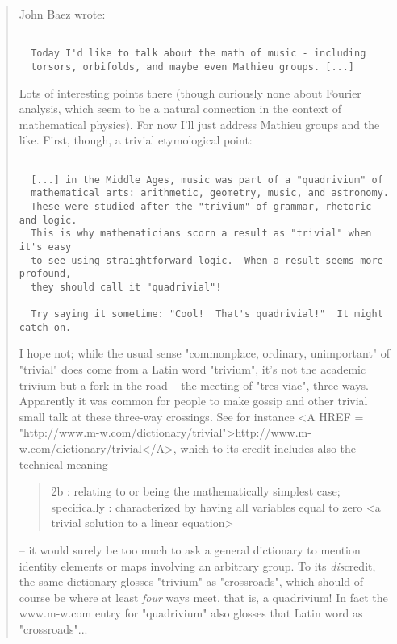 \begin{quote}

John Baez wrote:


\begin{verbatim}

  Today I'd like to talk about the math of music - including
  torsors, orbifolds, and maybe even Mathieu groups. [...]
\end{verbatim}
    

Lots of interesting points there (though curiously none about
Fourier analysis, which seem to be a natural connection in the context
of mathematical physics).  For now I'll just address Mathieu groups
and the like.  First, though, a trivial etymological point:


\begin{verbatim}

  [...] in the Middle Ages, music was part of a "quadrivium" of
  mathematical arts: arithmetic, geometry, music, and astronomy.
  These were studied after the "trivium" of grammar, rhetoric and logic.
  This is why mathematicians scorn a result as "trivial" when it's easy
  to see using straightforward logic.  When a result seems more profound,
  they should call it "quadrivial"!

  Try saying it sometime: "Cool!  That's quadrivial!"  It might catch on.
\end{verbatim}
    

I hope not; while the usual sense "commonplace, ordinary, unimportant"
of "trivial" does come from a Latin word "trivium", it's not the academic
trivium but a fork in the road -- the meeting of "tres viae", three ways.
Apparently it was common for people to make gossip and other trivial
small talk at these three-way crossings.  See for instance
<A HREF = "http://www.m-w.com/dictionary/trivial">http://www.m-w.com/dictionary/trivial</A>, which to its credit
includes also the technical meaning

\begin{quote}
  2b : relating to or being the mathematically simplest case;
  specifically : characterized by having all variables equal to zero
  <a trivial solution to a linear equation>
\end{quote}

-- it would surely be too much to ask a general dictionary to mention
identity elements or maps involving an arbitrary group.  To its
\emph{dis}credit, the same dictionary glosses "trivium" as "crossroads",
which should of course be where at least \emph{four} ways meet, that is,
a quadrivium!  In fact the www.m-w.com entry for "quadrivium" also
glosses that Latin word as "crossroads"...


\end{quote}
